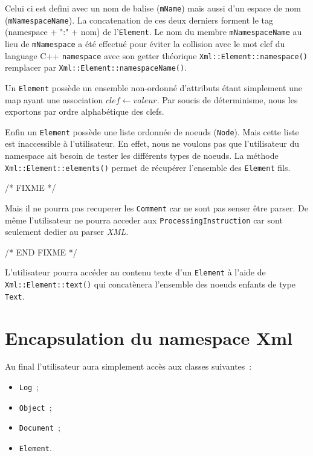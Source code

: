         Celui ci est defini avec un nom de balise (\lstinline$mName$) mais aussi d'un espace de nom (\lstinline$mNamespaceName$). La concatenation de ces deux derniers forment le tag (namespace + ":" + nom) de l'\lstinline$Element$. Le nom du membre \lstinline$mNamespaceName$ au lieu de \lstinline$mNamespace$ a été effectué pour éviter la collision avec le mot clef du language C++ \lstinline$namespace$ avec son getter théorique \lstinline$Xml::Element::namespace()$ remplacer par \lstinline$Xml::Element::namespaceName()$.

        Un \lstinline$Element$ possède un ensemble non-ordonné d'attributs étant simplement une map ayant une association $clef \leftarrow valeur$. Par soucis de déterminisme, nous les exportons par ordre alphabétique des clefs.

        Enfin un \lstinline$Element$ possède une liste ordonnée de noeuds (\lstinline$Node$). Mais cette liste est inaccessible à l'utilisateur. En effet, nous ne voulons pas que l'utilisateur du namespace ait besoin de tester les différents types de noeuds.
        La méthode \lstinline$Xml::Element::elements()$ permet de récupérer l'ensemble des \lstinline$Element$ fils.

    /* FIXME */


        Mais il ne pourra pas recuperer les \lstinline$Comment$ car ne sont pas senser être parser. De même l'utilisateur ne pourra acceder aux \lstinline$ProcessingInstruction$ car sont seulement dedier au parser \textit{XML}.

    /* END FIXME */

        L'utilisateur pourra accéder au contenu texte d'un \lstinline$Element$ à l'aide de \lstinline$Xml::Element::text()$ qui concatènera l'ensemble des noeuds enfants de type \lstinline$Text$.


\section{Encapsulation du namespace Xml}
    Au final l'utilisateur aura simplement accès aux classes suivantes~:

    \begin{itemize}
        \item \lstinline$Log$~;
        \item \lstinline$Object$~;
        \item \lstinline$Document$~;
        \item \lstinline$Element$.
    \end{itemize}

